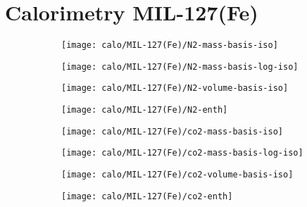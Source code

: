
\section{Calorimetry MIL-127(Fe)}

\begin{figure}[H]
    \centering

    \begin{subfigure}{0.25\linewidth}
        \texttt{[image: calo/MIL-127(Fe)/N2-mass-basis-iso]}%
        \label{appx:fig:shaping:mil127n2mass}
    \end{subfigure}%
    \begin{subfigure}{0.25\linewidth}
        \texttt{[image: calo/MIL-127(Fe)/N2-mass-basis-log-iso]}%
        \label{appx:fig:shaping:mil127n2masslog}
    \end{subfigure}%
    \begin{subfigure}{0.25\linewidth}
        \texttt{[image: calo/MIL-127(Fe)/N2-volume-basis-iso]}%
        \label{appx:fig:shaping:mil127n2volume}
    \end{subfigure}%
    \begin{subfigure}{0.25\linewidth}
        \texttt{[image: calo/MIL-127(Fe)/N2-enth]}%
        \label{appx:fig:shaping:mil127n2enth}
    \end{subfigure}%
    
    \begin{subfigure}{0.25\textwidth}
        \texttt{[image: calo/MIL-127(Fe)/co2-mass-basis-iso]}%
        \label{appx:fig:shaping:mil127co2mass}
    \end{subfigure}%
    \begin{subfigure}{0.25\textwidth}
        \texttt{[image: calo/MIL-127(Fe)/co2-mass-basis-log-iso]}%
        \label{appx:fig:shaping:mil127co2masslog}
    \end{subfigure}%
    \begin{subfigure}{0.25\textwidth}
        \texttt{[image: calo/MIL-127(Fe)/co2-volume-basis-iso]}%
        \label{appx:fig:shaping:mil127co2volume}
    \end{subfigure}%
    \begin{subfigure}{0.25\textwidth}
        \texttt{[image: calo/MIL-127(Fe)/co2-enth]}%
        \label{appx:fig:shaping:mil127co2enth}
    \end{subfigure}%


\end{figure}
